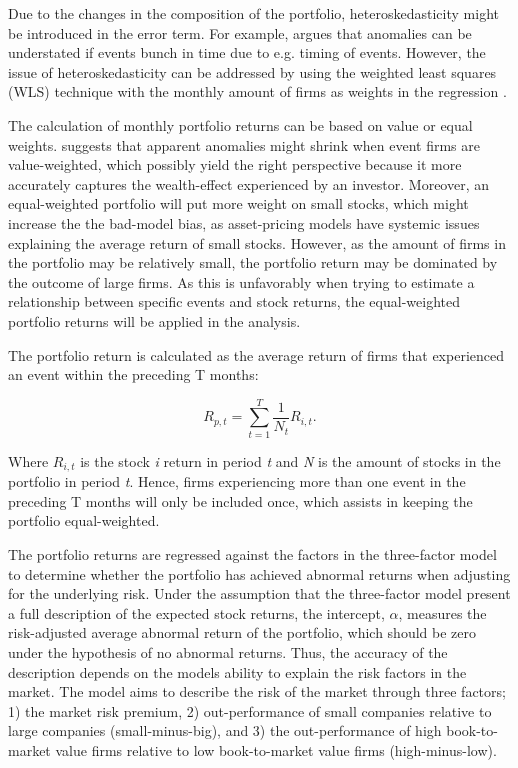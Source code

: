 Due to the changes in the composition of the portfolio, heteroskedasticity might be introduced in the error term. For example, \cite{ritter1995} argues that anomalies can be understated if events bunch in time due to e.g. timing of events. However, the issue of heteroskedasticity can be addressed by using the weighted least squares (WLS) technique with the monthly amount of firms as weights in the regression \citep{Ang_event_method}.

The calculation of monthly portfolio returns can be based on value or equal weights. \cite{fama1998_events} suggests that apparent anomalies might shrink when event firms are value-weighted, which possibly yield the right perspective because it more accurately captures the wealth-effect experienced by an investor. Moreover, an equal-weighted portfolio will put more weight on small stocks, which might increase the the bad-model bias, as asset-pricing models have systemic issues explaining the average return of small stocks. However, as the amount of firms in the portfolio may be relatively small, the portfolio return may be dominated by the outcome of large firms. As this is unfavorably when trying to estimate a relationship between specific events and stock returns, the equal-weighted portfolio returns will be applied in the analysis. 

The portfolio return is calculated as the average return of firms that experienced an event within the preceding T months:

\begin{equation}
    R_{p,t} = \sum_{t = 1} ^{T} \frac{1}{N_t} R_{i,t}.
\end{equation}

Where $R_{i,t}$ is the stock \textit{i} return in period \textit{t} and \textit{N} is the amount of stocks in the portfolio in period \textit{t}. Hence, firms experiencing more than one event in the preceding T months will only be included once, which assists in keeping the portfolio equal-weighted. 

The portfolio returns are regressed against the factors in the \cite{Fama_french_3fac} three-factor model to determine whether the portfolio has achieved abnormal returns when adjusting for the underlying risk. Under the assumption that the three-factor model present a full description of the expected stock returns, the intercept, $\alpha$, measures the risk-adjusted average abnormal return of the portfolio, which should be zero under the hypothesis of no abnormal returns. Thus, the accuracy of the description depends on the models ability to explain the risk factors in the market. The model aims to describe the risk of the market through three factors; 1) the market risk premium, 2) out-performance of small companies relative to large companies (small-minus-big), and 3) the out-performance of high book-to-market value firms  relative to low book-to-market value firms (high-minus-low). 

